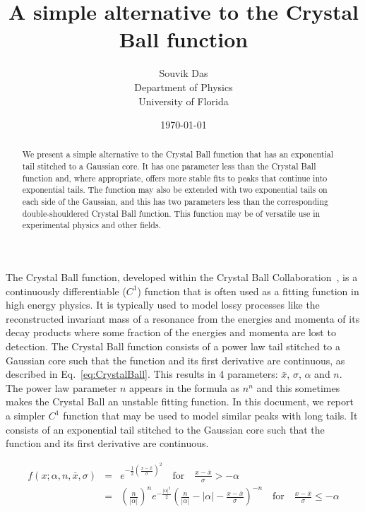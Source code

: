 \documentclass[10pt,letterpaper]{article}
\begin{document}
\title{A simple alternative to the Crystal Ball function}
\date{\today}
\author{Souvik Das\\ Department of Physics \\ University of Florida}
\maketitle

\begin{abstract}
We present a simple alternative to the Crystal Ball function that has an exponential tail stitched to a Gaussian core. It has one parameter less than the Crystal Ball function and, where appropriate, offers more stable fits to peaks that continue into exponential tails. The function may also be extended with two exponential tails on each side of the Gaussian, and this has two parameters less than the corresponding double-shouldered Crystal Ball function. This function may be of versatile use in experimental physics and other fields.
\end{abstract}

\bigskip

The Crystal Ball function, developed within the Crystal Ball Collaboration~\cite{Oreglia:1980cs, Skwarnicki:1986xj}, is a continuously differentiable ($C^1$) function that is often used as a fitting function in high energy physics. It is typically used to model lossy processes like the reconstructed invariant mass of a resonance from the energies and momenta of its decay products where some fraction of the energies and momenta are lost to detection. The Crystal Ball function consists of a power law tail stitched to a Gaussian core such that the function and its first derivative are continuous, as described in Eq.~\ref{eq:CrystalBall}. This results in 4 parameters: $\bar{x}$, $\sigma$, $\alpha$ and $n$. The power law parameter $n$ appears in the formula as $n^n$ and this sometimes makes the Crystal Ball an unstable fitting function. In this document, we report a simpler $C^1$ function that may be used to model similar peaks with long tails. It consists of an exponential tail stitched to the Gaussian core such that the function and its first derivative are continuous.

\begin{eqnarray}
\label{eq:CrystalBall}
f(x; \alpha, n, \bar{x}, \sigma) &=& e^{-\frac{1}{2}\left({\frac{x-\bar{x}}{\sigma}}\right)^2} \quad \textrm{for} \quad \frac{x-\bar{x}}{\sigma} > -\alpha \\
                                 &=& \left(\frac{n}{|\alpha|}\right)^n e^{-\frac{|\alpha|^2}{2}} \left( \frac{n}{|\alpha|} - |\alpha| - \frac{x-\bar{x}}{\sigma} \right)^{-n} \quad \textrm{for} \quad \frac{x-\bar{x}}{\sigma} \leq -\alpha \nonumber
\end{eqnarray} \\
\end{document}
